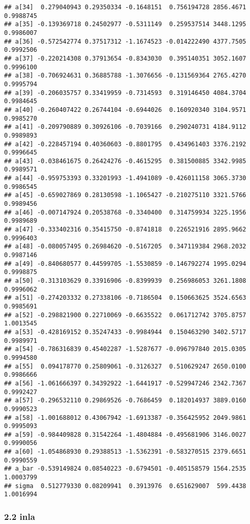 \documentclass[
]{article}
\begin{document}
\begin{verbatim}
## a[34]  0.279040943 0.29350334 -0.1648151  0.756194728 2856.4671 0.9988745
## a[35] -0.139369718 0.24502977 -0.5311149  0.259537514 3448.1295 0.9986007
## a[36] -0.572542774 0.37517312 -1.1674523 -0.014222490 4377.7505 0.9992506
## a[37] -0.220214308 0.37913654 -0.8343030  0.395140351 3052.1607 0.9996100
## a[38] -0.706924631 0.36885788 -1.3076656 -0.131569364 2765.4270 0.9995794
## a[39] -0.206035757 0.33419959 -0.7314593  0.319146450 4084.3704 0.9984645
## a[40] -0.260407422 0.26744104 -0.6944026  0.160920340 3104.9571 0.9985270
## a[41] -0.209790889 0.30926106 -0.7039166  0.290240731 4184.9112 0.9989893
## a[42] -0.228457194 0.40360603 -0.8801795  0.434961403 3376.2192 0.9996645
## a[43] -0.038461675 0.26424276 -0.4615295  0.381500885 3342.9985 0.9989571
## a[44] -0.959753393 0.33201993 -1.4941089 -0.426011158 3065.3730 0.9986545
## a[45] -0.659027869 0.28130598 -1.1065427 -0.210275110 3321.5766 0.9989456
## a[46] -0.007147924 0.20538768 -0.3340400  0.314759934 3225.1956 0.9989689
## a[47] -0.333402316 0.35415750 -0.8741818  0.226521916 2895.9662 0.9996403
## a[48] -0.080057495 0.26984620 -0.5167205  0.347119384 2968.2032 0.9987146
## a[49] -0.840680577 0.44599705 -1.5530859 -0.146792274 1995.0294 0.9998875
## a[50] -0.313103629 0.33916906 -0.8399939  0.256986053 3261.1808 0.9996062
## a[51] -0.274203332 0.27338106 -0.7186504  0.150663625 3524.6563 0.9985691
## a[52] -0.298821900 0.22710069 -0.6635522  0.061712742 3705.8757 1.0013545
## a[53] -0.428169152 0.35247433 -0.9984944  0.150463290 3402.5717 0.9989971
## a[54] -0.786316839 0.45402287 -1.5287677 -0.096797840 2015.0305 0.9994580
## a[55]  0.094178770 0.25809061 -0.3126327  0.510629247 2650.0100 0.9986666
## a[56] -1.061666397 0.34392922 -1.6441917 -0.529947246 2342.7367 0.9992427
## a[57] -0.296532110 0.29869526 -0.7686459  0.182014937 3889.0160 0.9990523
## a[58] -1.001688012 0.43067942 -1.6913387 -0.356425952 2049.9861 0.9995093
## a[59] -0.984409828 0.31542264 -1.4804884 -0.495681906 3146.0027 0.9990056
## a[60] -1.054868930 0.29388513 -1.5362391 -0.583270515 2379.6651 0.9990559
## a_bar -0.539149824 0.08540223 -0.6794501 -0.405158579 1564.2535 1.0003799
## sigma  0.512779330 0.08209941  0.3913976  0.651629007  599.4438 1.0016994
\end{verbatim}

\hypertarget{inla-6}{%
\subsubsection{2.2 inla}\label{inla-6}}
\end{document}
